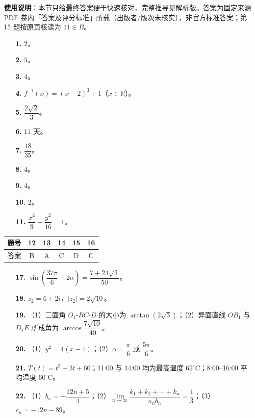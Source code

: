
\begin{gknotice}
\textbf{使用说明}：本节只给最终答案便于快速核对，完整推导见解析版。答案为固定来源 PDF 卷内「答案及评分标准」所载（出版者/版次未核实），非官方标准答案；第 15 题按原页核读为 $11\in B$。
\end{gknotice}

\begin{itemize}[leftmargin=2.6em]
  \item[\textbf{1.}] $2$。
  \item[\textbf{2.}] $5$。
  \item[\textbf{3.}] $4$。
  \item[\textbf{4.}] $f^{-1}(x)=(x-2)^3+1$（$x\in\mathbb R$）。
  \item[\textbf{5.}] $\dfrac{2\sqrt2}{3}$。
  \item[\textbf{6.}] $11$ 天。
  \item[\textbf{7.}] $\dfrac{18}{35}$。
  \item[\textbf{8.}] $4$。
  \item[\textbf{9.}] $4$。
  \item[\textbf{10.}] $2$。
  \item[\textbf{11.}] $\dfrac{x^2}{9}-\dfrac{y^2}{16}=1$。
\end{itemize}

\begin{center}\begin{tabular}{cccccc}
\toprule
题号 & 12 & 13 & 14 & 15 & 16 \\
\midrule
答案 & B & A & C & D & C \\
\bottomrule
\end{tabular}\end{center}

\begin{itemize}[leftmargin=2.6em]
  \item[\textbf{17.}] $\sin\left(\dfrac{37\pi}{6}-2\alpha\right)=\dfrac{7+24\sqrt3}{50}$。
  \item[\textbf{18.}] $z_2=6+2i$，$|z_2|=2\sqrt{10}$。
  \item[\textbf{19.}] （1）二面角 $O_1\text{-}BC\text{-}D$ 的大小为 $\arctan(2\sqrt3)$；（2）异面直线 $OB_1$ 与 $D_1E$ 所成角为 $\arccos\dfrac{7\sqrt{10}}{40}$。
  \item[\textbf{20.}] （1）$y^2=4(x-1)$；（2）$\alpha=\dfrac\pi6$ 或 $\dfrac{5\pi}6$。
  \item[\textbf{21.}] $T(t)=t^3-3t+60$；11:00 与 14:00 均为最高温度 $62^\circ\mathrm C$；8:00–16:00 平均温度 $60^\circ\mathrm C$。
  \item[\textbf{22.}] （1）$b_n=-\dfrac{12n+5}{4}$；（2）$\lim\limits_{n\to\infty}\dfrac{k_1+k_2+\cdots+k_n}{a_nb_n}=\dfrac13$；（3）$c_n=-12n-89$。
\end{itemize}
